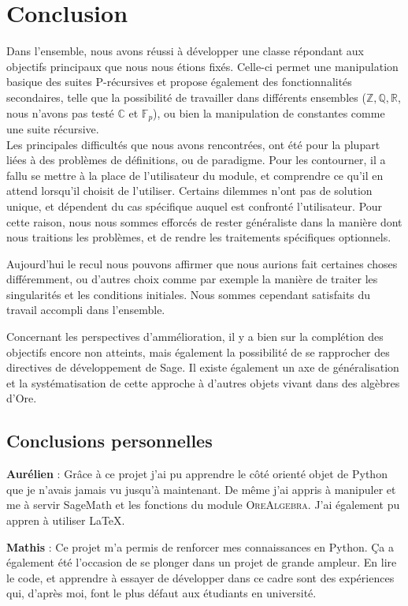 \documentclass[12pt]{article}
\begin{document}
\section{Conclusion}
    Dans l'ensemble, nous avons réussi à développer une classe répondant aux objectifs
    principaux que nous nous étions fixés.
    Celle-ci permet une manipulation basique des suites P-récursives 
    et propose également des fonctionnalités secondaires, telle que la possibilité de travailler
    dans différents ensembles ($\mathbb{Z,Q,R}$, nous n'avons pas testé $\mathbb{C}$ et 
    $\mathbb F_p$), ou bien la manipulation de constantes comme une suite récursive.\\
    Les principales difficultés que nous avons rencontrées, ont été pour la plupart liées
    à des problèmes de définitions, ou de paradigme. Pour les contourner, il a fallu
    se mettre à la place de l'utilisateur du module, et comprendre ce qu'il en attend lorsqu'il choisit
    de l'utiliser. Certains dilemmes n'ont pas de solution unique, et dépendent du cas spécifique
    auquel est confronté l'utilisateur. Pour cette raison, nous nous sommes efforcés de rester 
    généraliste dans la manière dont nous traitions les problèmes, et de rendre les traitements
    spécifiques optionnels.\\
    \par Aujourd'hui le recul nous pouvons affirmer que nous aurions fait certaines choses
    différemment, ou d'autres choix
    comme par exemple la manière de traiter les singularités et les conditions
    initiales. Nous sommes cependant satisfaits du travail accompli dans l'ensemble.\\
    \par Concernant les perspectives d'ammélioration, il y a bien sur la complétion des objectifs
    encore non atteints, mais également la possibilité de se rapprocher des directives de
    développement de Sage. Il existe également un axe de généralisation et la systématisation
    de cette approche à d'autres objets vivant dans des algèbres d'Ore.\\
    \subsection*{Conclusions personnelles}
        \textbf{Aurélien} :
        Grâce à ce projet j'ai pu apprendre le côté orienté objet de Python que je n'avais jamais vu
        jusqu'à maintenant.
        De même j'ai appris à manipuler et me à servir SageMath et les fonctions du module 
        \textsc{OreAlgebra}. J'ai également pu appren à utiliser \LaTeX.\\[1cm]
        \par \textbf{Mathis} : Ce projet m'a permis de renforcer mes connaissances en Python.
        \c{C}a a également été l'occasion de se plonger dans un projet de grande ampleur.
        En lire le code, et apprendre à essayer de développer dans ce cadre sont des expériences qui,
        d'après moi, font le plus défaut aux étudiants en université.

\newpage

\nocite{*}


        
       

\end{document}
